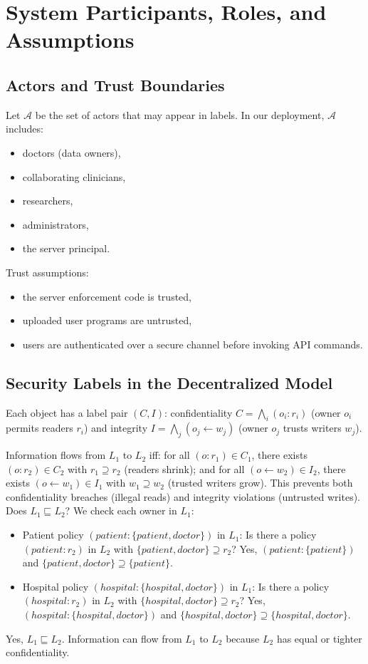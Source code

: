 \section{System Participants, Roles, and Assumptions}

\subsection{Actors and Trust Boundaries}

Let $\mathcal{A}$ be the set of actors that may appear in labels. In our deployment, $\mathcal{A}$ includes:
\begin{itemize}
    \item doctors (data owners),
    \item collaborating clinicians,
    \item researchers,
    \item administrators,
    \item the server principal.
\end{itemize}

Trust assumptions:
\begin{itemize}
    \item the server enforcement code is trusted,
    \item uploaded user programs are untrusted,
    \item users are authenticated over a secure channel before invoking API commands.
\end{itemize}

\subsection{Security Labels in the Decentralized Model}

Each object has a label pair $(C, I)$: confidentiality $C = \bigwedge_i (o_i:r_i)$ (owner $o_i$ permits readers $r_i$) and integrity $I = \bigwedge_j (o_j \leftarrow w_j)$ (owner $o_j$ trusts writers $w_j$). 

Information flows from $L_1$ to $L_2$ iff: for all $(o:r_1) \in C_1$, there exists $(o:r_2) \in C_2$ with $r_1 \supseteq r_2$ (readers shrink); and for all $(o \leftarrow w_2) \in I_2$, there exists $(o \leftarrow w_1) \in I_1$ with $w_1 \supseteq w_2$ (trusted writers grow). This prevents both confidentiality breaches (illegal reads) and integrity violations (untrusted writes).
Does $L_1 \sqsubseteq L_2$? We check each owner in $L_1$:
\begin{itemize}
  \item Patient policy $(patient:\{patient,doctor\})$ in $L_1$: Is there a policy $(patient:r_2)$ in $L_2$ with $\{patient,doctor\} \supseteq r_2$? Yes, $(patient:\{patient\})$ and $\{patient,doctor\} \supseteq \{patient\}$. \checkmark
  \item Hospital policy $(hospital:\{hospital,doctor\})$ in $L_1$: Is there a policy $(hospital:r_2)$ in $L_2$ with $\{hospital,doctor\} \supseteq r_2$? Yes, $(hospital:\{hospital,doctor\})$ and $\{hospital,doctor\} \supseteq \{hospital,doctor\}$. \checkmark
\end{itemize}
Yes, $L_1 \sqsubseteq L_2$. Information can flow from $L_1$ to $L_2$ because $L_2$ has equal or tighter confidentiality.


